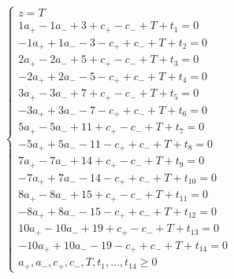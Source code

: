 \documentclass[a4paper]{article}
\begin{document}
$\left\{\begin{array}{lll}
z=T\\
1a_+-1a_-+3+c_+-c_-+T+t_{1}=0\\
-1a_++1a_--3-c_++c_-+T+t_{2}=0\\

2a_+-2a_-+5+c_+-c_-+T+t_{3}=0\\
-2a_++2a_--5-c_++c_-+T+t_{4}=0\\

3a_+-3a_-+7+c_+-c_-+T+t_{5}=0\\
-3a_++3a_--7-c_++c_-+T+t_{6}=0\\

5a_+-5a_-+11+c_+-c_-+T+t_{7}=0\\
-5a_++5a_--11-c_++c_-+T+t_{8}=0\\

7a_+-7a_-+14+c_+-c_-+T+t_{9}=0\\
-7a_++7a_--14-c_++c_-+T+t_{10}=0\\

8a_+-8a_-+15+c_+-c_-+T+t_{11}=0\\
-8a_++8a_--15-c_++c_-+T+t_{12}=0\\

10a_+-10a_-+19+c_+-c_-+T+t_{13}=0\\
-10a_++10a_--19-c_++c_-+T+t_{14}=0\\

a_+,a_-,c_+,c_-,T,t_1,...,t_{14}\geqslant 0
\end{array}\right.$
\newpage
\end{document}
